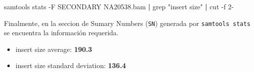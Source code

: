 \documentclass[
]{article}
\newenvironment{Shaded}{\begin{snugshade}}{\end{snugshade}}
\newcommand{\AttributeTok}[1]{\textcolor[rgb]{0.77,0.63,0.00}{#1}}
\newcommand{\ExtensionTok}[1]{#1}
\newcommand{\FunctionTok}[1]{\textcolor[rgb]{0.00,0.00,0.00}{#1}}
\newcommand{\KeywordTok}[1]{\textcolor[rgb]{0.13,0.29,0.53}{\textbf{#1}}}
\newcommand{\NormalTok}[1]{#1}
\newcommand{\StringTok}[1]{\textcolor[rgb]{0.31,0.60,0.02}{#1}}
\providecommand{\tightlist}{%
  \setlength{\itemsep}{0pt}\setlength{\parskip}{0pt}}
\begin{document}
\begin{Shaded}
\begin{Highlighting}[]
\ExtensionTok{samtools}\NormalTok{ stats }\AttributeTok{{-}F}\NormalTok{ SECONDARY NA20538.bam }\KeywordTok{|} \FunctionTok{grep} \StringTok{"insert size"} \KeywordTok{|} \FunctionTok{cut} \AttributeTok{{-}f}\NormalTok{ 2{-}}
\end{Highlighting}
\end{Shaded}

Finalmente, en la seccion de Sumary Numbers (\texttt{SN}) generada por
\texttt{samtools\ stats} se encuentra la información requerida.

\begin{itemize}
\tightlist
\item
  insert size average: \textbf{190.3}
\item
  insert size standard deviation: \textbf{136.4}
\end{itemize}
\end{document}
